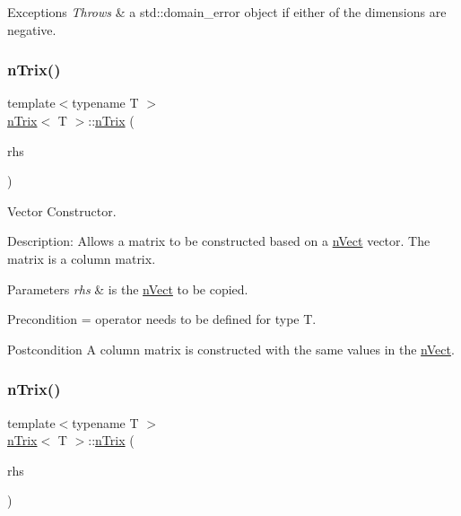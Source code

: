 \begin{DoxyExceptions}{Exceptions}
{\em Throws} & a std\+::domain\+\_\+error object if either of the dimensions are negative. \\
\hline
\end{DoxyExceptions}
\mbox{\label{classnTrix_a702b976039784b4b6d699c929f835270}} 
\subsubsection{\texorpdfstring{n\+Trix()}{nTrix()}\hspace{0.1cm}{\footnotesize\ttfamily [4/5]}}
{\footnotesize\ttfamily template$<$typename T $>$ \\
\hyperlink{classnTrix}{n\+Trix}$<$ T $>$\+::\hyperlink{classnTrix}{n\+Trix} (\begin{DoxyParamCaption}\item[{const \hyperlink{classnVect}{n\+Vect}$<$ T $>$ \&}]{rhs }\end{DoxyParamCaption})}



Vector Constructor. 

Description\+: Allows a matrix to be constructed based on a \hyperlink{classnVect}{n\+Vect} vector. The matrix is a column matrix. 
\begin{DoxyParams}{Parameters}
{\em rhs} & is the \hyperlink{classnVect}{n\+Vect} to be copied. \\
\hline
\end{DoxyParams}
\begin{DoxyPrecond}{Precondition}
= operator needs to be defined for type T. 
\end{DoxyPrecond}
\begin{DoxyPostcond}{Postcondition}
A column matrix is constructed with the same values in the \hyperlink{classnVect}{n\+Vect}. 
\end{DoxyPostcond}
\mbox{\label{classnTrix_a490ebc8fb7a94e577b33e05b16daafec}} 
\subsubsection{\texorpdfstring{n\+Trix()}{nTrix()}\hspace{0.1cm}{\footnotesize\ttfamily [5/5]}}
{\footnotesize\ttfamily template$<$typename T $>$ \\
\hyperlink{classnTrix}{n\+Trix}$<$ T $>$\+::\hyperlink{classnTrix}{n\+Trix} (\begin{DoxyParamCaption}\item[{const \hyperlink{classnTrix}{n\+Trix}$<$ T $>$ \&}]{rhs }\end{DoxyParamCaption})}



